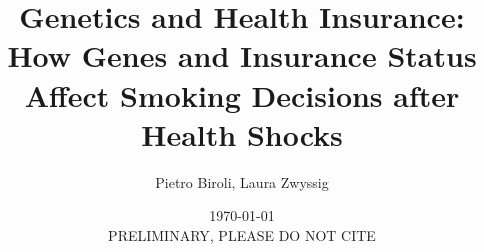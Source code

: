 \documentclass[12pt]{article}
\begin{document}
\title{
Genetics and Health Insurance: How Genes and Insurance Status Affect Smoking Decisions after Health Shocks
}

\author{Pietro Biroli, Laura Zwyssig}


\date{\today \\ PRELIMINARY, PLEASE DO NOT CITE}

\maketitle
\end{document}
